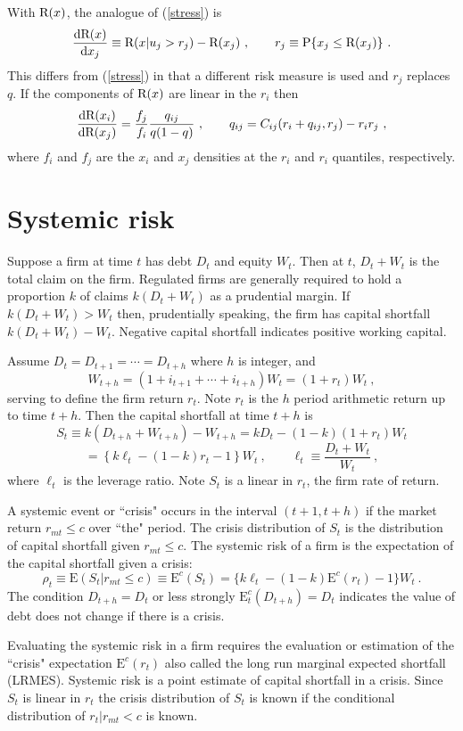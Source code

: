 \documentclass[authoryear]{elsarticle}
\newcommand{\E}{\mathrm{E}}
\newcommand{\p}{\mathrm{P}}
\newcommand{\de}{\mathrm{d}}
\newcommand{\eref}[1]{(\ref{#1})}
\newcommand{\cq}{\ , \qquad}
\newcommand{\be}[1]{\begin{equation}\label{#1}}
\newcommand{\ee}{\end{equation}}
\begin{document}
With $\mathrm{R}(x)$, the analogue of \eref{stress} is 
\be{stress2}
\frac{\de\r(x)}{\de x_j} \equiv \r(x|u_j>r_j) - \r(x_j)\cq r_j\equiv\p\{x_j\le\r(x_j)\} \ .
\ee
This differs from \eref{stress}  in that a different risk measure is used and  $r_j$ replaces $q$.   If  the components of $\mathrm{R}(x)$ are linear in the $r_i$ then
\be{implicit2}
\frac{\de\r(x_i)}{\de\r(x_j)} =  
\frac{f_j}{f_i} 
 \frac{q_{ij}}{q(1-q)}\cq q_{ij}=C_{ij}(r_i+q_{ij},r_j) - r_ir_j\ ,
\ee
where $f_i$ and $f_j$ are the $x_i$ and $x_j$ densities at the $r_i$ and $r_i$ quantiles, respectively. 

\section{Systemic risk}

Suppose a firm at time $t$ has debt $D_t$ and equity $W_t$.   Then at $t$, $D_t+W_t$ is the total claim on the firm. 
Regulated firms are generally required to hold a proportion $k$ of claims $k(D_t+W_t)$ as a prudential margin.    If  $k(D_t+W_t)>W_t$ then, prudentially speaking, the firm has capital shortfall   $k(D_t+W_t)-W_t$.  Negative capital shortfall indicates positive working capital.

Assume $D_t=D_{t+1}=\cdots=D_{t+h}$ where $h$ is integer,  and 
$$
W_{t+h} = (1+i_{t+1}+\cdots+i_{t+h})W_t=(1+r_{t})W_t\ ,
$$
serving to define the firm return $r_t$.  Note $r_t$ is the  $h$ period arithmetic return up to  time $t+h$.  
Then the capital shortfall at time $t+h$ is 
$$
S_t\equiv  k(D_{t+h}+W_{t+h})-W_{t+h} = k D_{t} - (1-k)(1+r_{t})W_t
$$
\be{cs}= \left\{k\ell_t-(1-k)r_{t} - 1\right\}W_t\cq \ell_t\equiv\frac{D_t+W_t}{W_t}\ ,
\ee
where $\ell_t$ is the leverage ratio.  Note  $S_t$ is a linear in $r_t$, the firm rate of return.


A systemic event or ``crisis"   occurs in the interval $(t+1,t+h)$ if the market  return $r_{mt}\le c$ over ``the" period.   The crisis distribution of $S_t$ is the distribution of capital shortfall given $r_{mt}\le c$.  The systemic risk of  a firm is the expectation of the capital shortfall given  a crisis:
\be{sr}
\rho_t\equiv \E(S_t|r_{mt}\le c) \equiv \E^c(S_t) =  \{k\ell_t-(1-k)\E^c(r_{t})-1\}W_t\ .
\ee
The condition $D_{t+h}=D_t$ or less strongly $\E_t^c(D_{t+h})=D_t$ indicates the value of debt  does not change if there is a crisis.   

Evaluating the systemic risk in a firm requires the evaluation or estimation of the ``crisis" expectation $\E^c(r_{t})$ also called the long run marginal expected shortfall (LRMES).  Systemic risk is a point estimate of capital shortfall in a crisis.   Since $S_t$ is linear in $r_t$ the crisis distribution of $S_t$ is known if the conditional distribution of $r_t|r_{mt}<c$ is known.      
  
\end{document}
